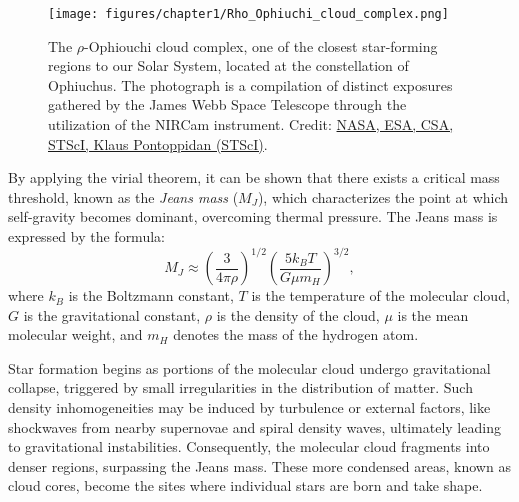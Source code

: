 \documentclass[main.tex]{subfiles}
\begin{document}
    \begin{figure}[t]
        \centering
        \texttt{[image: figures/chapter1/Rho\_Ophiuchi\_cloud\_complex.png]}
        \caption{The $\rho$-Ophiouchi cloud complex, one of the closest star-forming regions to our Solar System, located at the constellation of Ophiuchus. The photograph is a compilation of distinct exposures gathered by the James Webb Space Telescope through the utilization of the NIRCam instrument. Credit: \href{https://webbtelescope.org/contents/media/images/2023/128/01H449193V5Q4Q6GFBKXAZ3S03}{NASA, ESA, CSA, STScI, Klaus Pontoppidan (STScI)}.}
        \label{fig:rho_ophiouchi}
    \end{figure}

    By applying the virial theorem, it can be shown that there exists a critical mass threshold, known as the \textit{Jeans mass} ($M_J$), which characterizes the point at which self-gravity becomes dominant, overcoming thermal pressure. The Jeans mass is expressed by the formula:
    \begin{equation}\label{eq:jeans_mass}
        M_J \approx \left(\frac{3}{4\pi \rho}\right)^{1/2} \left(\frac{5k_BT}{G\mu m_H }\right)^{3/2}, 
    \end{equation}
    where $k_B$ is the Boltzmann constant, $T$ is the temperature of the molecular cloud, $G$ is the gravitational constant, $\rho$ is the density of the cloud, $\mu$ is the mean molecular weight, and $m_H$ denotes the mass of the hydrogen atom.

    Star formation begins as portions of the molecular cloud undergo gravitational collapse, triggered by small irregularities in the distribution of matter. Such density inhomogeneities may be induced by turbulence or external factors, like shockwaves from nearby supernovae and spiral density waves, ultimately leading to gravitational instabilities. Consequently, the molecular cloud fragments into denser regions, surpassing the Jeans mass. These more condensed areas, known as cloud cores, become the sites where individual stars are born and take shape.
\end{document}
